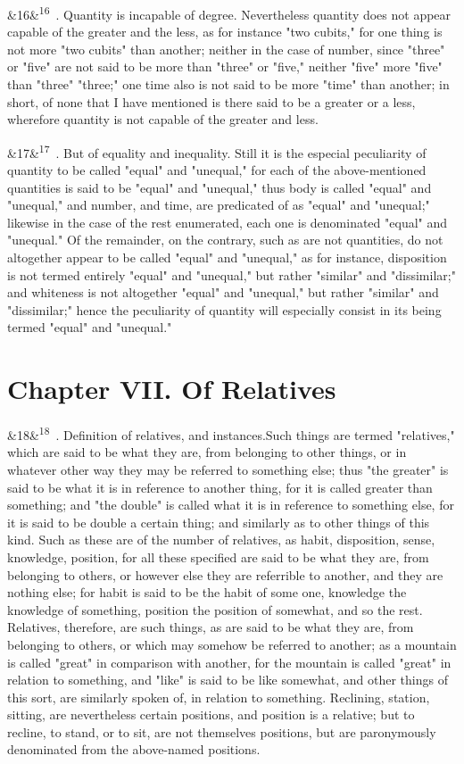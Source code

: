 \documentclass[12pt]{article}
\newcommand{\para}[1][]{\par\noindent\ifx&#1&\else\textsuperscript{\footnotesize #1}~\fi}
\begin{document}
\para[16] 15. Quantity is incapable of degree. Nevertheless quantity does not appear capable of the greater and the less, as for instance "two cubits," for one thing is not more "two cubits" than another; neither in the case of number, since "three" or "five" are not said to be more than "three" or "five," neither "five" more "five" than "three" "three;" one time also is not said to be more "time" than another; in short, of none that I have mentioned is there said to be a greater or a less, wherefore quantity is not capable of the greater and less.

\para[17] 16. But of equality and inequality. Still it is the especial peculiarity of quantity to be called "equal" and "unequal," for each of the above-mentioned quantities is said to be "equal" and "unequal," thus body is called "equal" and "unequal," and number, and time, are predicated of as "equal" and "unequal;" likewise in the case of the rest enumerated, each one is denominated "equal" and "unequal." Of the remainder, on the contrary, such as are not quantities, do not altogether appear to be called "equal" and "unequal," as for instance, disposition is not termed entirely "equal" and "unequal," but rather "similar" and "dissimilar;" and whiteness is not altogether "equal" and "unequal," but rather "similar" and "dissimilar;" hence the peculiarity of quantity will especially consist in its being termed "equal" and "unequal."

\section*{Chapter VII. Of Relatives}

\para[18] 1. Definition of relatives, and instances.Such things are termed "relatives," which are said to be what they are, from belonging to other things, or in whatever other way they may be referred to something else; thus "the greater" is said to be what it is in reference to another thing, for it is called greater than something; and "the double" is called what it is in reference to something else, for it is said to be double a certain thing; and similarly as to other things of this kind. Such as these are of the number of relatives, as habit, disposition, sense, knowledge, position, for all these specified are said to be what they are, from belonging to others, or however else they are referrible to another, and they are nothing else; for habit is said to be the habit of some one, knowledge the knowledge of something, position the position of somewhat, and so the rest. Relatives, therefore, are such things, as are said to be what they are, from belonging to others, or which may somehow be referred to another; as a mountain is called "great" in comparison with another, for the mountain is called "great" in relation to something, and "like" is said to be like somewhat, and other things of this sort, are similarly spoken of, in relation to something. Reclining, station, sitting, are nevertheless certain positions, and position is a relative; but to recline, to stand, or to sit, are not themselves positions, but are paronymously denominated from the above-named positions.
\end{document}
